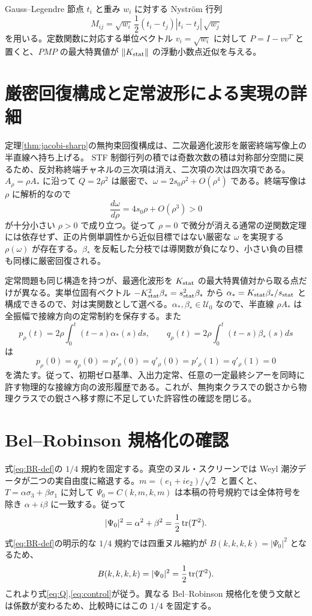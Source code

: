 Gauss--Legendre 節点 $t_i$ と重み $w_i$ に対する Nystr\"om 行列
\[
M_{ij}=\sqrt{w_i}\,\frac12(t_i-t_j)|t_i-t_j|\,\sqrt{w_j}
\]
を用いる。定数関数に対応する単位ベクトル $v_i=\sqrt{w_i}$ に対して $P=I-vv^T$ と置くと、$PMP$ の最大特異値が $\|K_{\rm stat}\|$ の浮動小数点近似を与える。

\section{厳密回復構成と定常波形による実現の詳細}
定理\ref{thm:jacobi-sharp}の無拘束回復構成は、二次最適化波形を厳密終端写像上の半直線へ持ち上げる。 STF 制御行列の積では奇数次数の積は対称部分空間に戻るため、反対称終端チャネルの三次項は消え、二次項の次は四次項である。$A_\rho=\rho A_*$ に沿って $Q=2\rho^2$ は厳密で、$\omega=2s_0 \rho^2+O(\rho^4)$ である。終端写像は $\rho$ に解析的なので
\[
\frac{d\omega}{d\rho}=4s_0\rho+O(\rho^3)>0
\]
が十分小さい $\rho>0$ で成り立つ。従って $\rho=0$ で微分が消える通常の逆関数定理には依存せず、正の片側単調性から近似目標ではない厳密な $\omega$ を実現する $\rho(\omega)$ が存在する。$\beta_*$ を反転した分枝では導関数が負になり、小さい負の目標も同様に厳密回復される。

定常問題も同じ構造を持つが、最適化波形を $K_{\rm stat}$ の最大特異値対から取る点だけが異なる。実単位固有ベクトル $-K_{\rm stat}^2\beta_*=s_{\rm stat}^2\beta_*$ から $\alpha_*=K_{\rm stat}\beta_*/s_{\rm stat}$ と構成できるので、対は実関数として選べる。$\alpha_*,\beta_*\in\mathcal U_0$ なので、半直線 $\rho A_*$ は全振幅で接線方向の定常制約を保存する。また
\[
p_\rho(t)=2\rho\int_0^t(t-s)\alpha_*(s)ds,\qquad
q_\rho(t)=2\rho\int_0^t(t-s)\beta_*(s)ds
\]
は
\[
p_\rho(0)=q_\rho(0)=p'_\rho(0)=q'_\rho(0)=p'_\rho(1)=q'_\rho(1)=0
\]
を満たす。従って、初期ゼロ基準、入出力定常、任意の一定最終シアーを同時に許す物理的な接線方向の波形履歴である。これが、無拘束クラスでの鋭さから物理クラスでの鋭さへ移す際に不足していた許容性の確認を閉じる。

\section{Bel--Robinson 規格化の確認}
式\eqref{eq:BR-def}の $1/4$ 規約を固定する。真空のヌル・スクリーンでは Weyl 潮汐データが二つの実自由度に縮退する。$m=(e_1+i e_2)/\sqrt2$ と置くと、$T=\alpha\sigma_3+\beta\sigma_1$ に対して $\Psi_0=C(k,m,k,m)$ は本稿の符号規約では全体符号を除き $\alpha+i\beta$ に一致する。従って
\[
|\Psi_0|^2=\alpha^2+\beta^2=\frac12\operatorname{tr}(T^2).
\]
式\eqref{eq:BR-def}の明示的な $1/4$ 規約では四重ヌル縮約が $B(k,k,k,k)=|\Psi_0|^2$ となるため、
\[
B(k,k,k,k)=|\Psi_0|^2=\frac12\operatorname{tr}(T^2).
\]
これより式\eqref{eq:Q},\eqref{eq:control}が従う。異なる Bel--Robinson 規格化を使う文献とは係数が変わるため、比較時にはこの $1/4$ を固定する。

